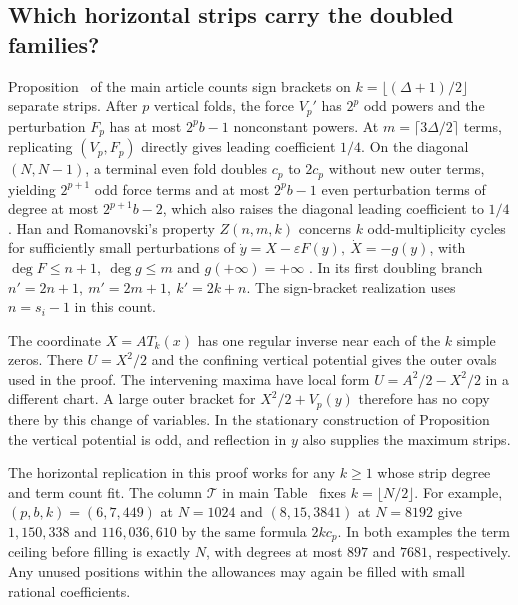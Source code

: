 \subsection{Which horizontal strips carry the doubled families?}\label{sup:lienard-product}
Proposition~ of the main article counts sign brackets on \(k=\lfloor(\Delta+1)/2\rfloor\) separate strips. After \(p\) vertical folds, the force \(V_p'\) has \(2^p\) odd powers and the perturbation \(F_p\) has at most \(2^pb-1\) nonconstant powers. At \(m=\lceil3\Delta/2\rceil\) terms, replicating \((V_p,F_p)\) directly gives leading coefficient \(1/4\). On the diagonal \((N,N-1)\), a terminal even fold doubles \(c_p\) to \(2c_p\) without new outer terms, yielding \(2^{p+1}\) odd force terms and at most \(2^pb-1\) even perturbation terms of degree at most \(2^{p+1}b-2\), which also raises the diagonal leading coefficient to \(1/4\). Han and Romanovski's property \(Z(n,m,k)\) concerns \(k\) odd-multiplicity cycles for sufficiently small perturbations of \(\dot y=X-\varepsilon F(y),\ \dot X=-g(y)\), with \(\deg F\le n+1,\ \deg g\le m\) and \(g(+\infty)=+\infty\) \cite{HanRomanovski}. In its first doubling branch \(n'=2n+1,\ m'=2m+1,\ k'=2k+n\). The sign-bracket realization uses \(n=s_i-1\) in this count.

The coordinate \(X=AT_k(x)\) has one regular inverse near each of the \(k\) simple zeros. There \(U=X^2/2\) and the confining vertical potential gives the outer ovals used in the proof. The intervening maxima have local form \(U=A^2/2-X^2/2\) in a different chart. A large outer bracket for \(X^2/2+V_p(y)\) therefore has no copy there by this change of variables. In the stationary construction of Proposition~ the vertical potential is odd, and reflection in \(y\) also supplies the maximum strips.

The horizontal replication in this proof works for any \(k\ge1\) whose strip degree and term count fit. The column \(\mathcal T\) in main Table~ fixes \(k=\lfloor N/2\rfloor\). For example, \((p,b,k)=(6,7,449)\) at \(N=1024\) and \((8,15,3841)\) at \(N=8192\) give \(1{,}150{,}338\) and \(116{,}036{,}610\) by the same formula \(2kc_p\). In both examples the term ceiling before filling is exactly \(N\), with degrees at most \(897\) and \(7681\), respectively. Any unused positions within the allowances may again be filled with small rational coefficients.

